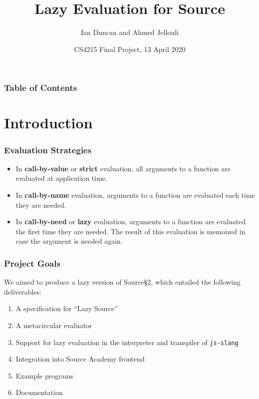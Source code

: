 \documentclass[12pt]{beamer}
\begin{document}
\newcommand{\mathsc}[1]{{\normalfont\textsc{#1}}}
\newcommand{\tforce}[2]{\mathfrak{V}\left(#1, #2\right)}
\author{Ian Duncan and Ahmed Jellouli}
\title{Lazy Evaluation for Source}
\date{CS4215 Final Project, 13 April 2020}
\begin{frame}[plain]
	\maketitle
\end{frame}

\begin{frame}
\frametitle{Table of Contents}
\tableofcontents
\end{frame}

\section{Introduction}

\begin{frame}
\frametitle{Evaluation Strategies}
\begin{itemize}
\item<1->In \textbf{call-by-value} or \textbf{strict} evaluation, all arguments to a function are evaluated at application time.

\item<2->In \textbf{call-by-name} evaluation, arguments to a function are evaluated each time they are needed.

\item<3->In \textbf{call-by-need} or \textbf{lazy} evaluation, arguments to a function are evaluated the first time they are needed. The result of this evaluation is memoized in case the argument is needed again.
\end{itemize}
\end{frame}

\begin{frame}
\frametitle{Project Goals}
We aimed to produce a lazy version of Source\S2, which entailed the following deliverables:\pause
\begin{enumerate}
\item<2->A specification for ``Lazy Source'' 
\item<3->A metacircular evaluator
\item<4->Support for lazy evaluation in the interpreter and transpiler of \texttt{js-slang}
\item<5->Integration into Source Academy frontend
\item<6->Example programs
\item<7->Documentation
\end{enumerate}
\end{frame}
\end{document}
